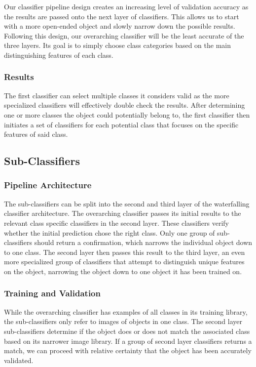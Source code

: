 \documentclass[draftclsnofoot, onecolumn, 10pt, compsoc]{IEEEtran}
\begin{document}
				Our classifier pipeline design creates an increasing level of validation accuracy as the results are passed onto the next layer of classifiers. This allows us to start with a more open-ended object and slowly narrow down the possible results. Following this design, our overarching classifier will be the least accurate of the three layers. Its goal is to simply choose class categories based on the main distinguishing features of each class.

			\subsubsection{Results}
				The first classifier can select multiple classes it considers valid as the more specialized classifiers will effectively double check the results. After determining one or more classes the object could potentially belong to, the first classifier then initiates a set of classifiers for each potential class that focuses on the specific features of said class.

		\subsection{Sub-Classifiers}
			\subsubsection{Pipeline Architecture}
				The sub-classifiers can be split into the second and third layer of the waterfalling classifier architecture. The overarching classifier passes its initial results to the relevant class specific classifiers in the second layer. These classifiers verify whether the initial prediction chose the right class. Only one group of sub-classifiers should return a confirmation, which narrows the individual object down to one class. The second layer then passes this result to the third layer, an even more specialized group of classifiers that attempt to distinguish unique features on the object, narrowing the object down to one object it has been trained on.

			\subsubsection{Training and Validation}
				While the overarching classifier has examples of all classes in its training library, the sub-classifiers only refer to images of objects in one class. The second layer sub-classifiers determine if the object does or does not match the associated class based on its narrower image library. If a group of second layer classifiers returns a match, we can proceed with relative certainty that the object has been accurately validated.
\end{document}

